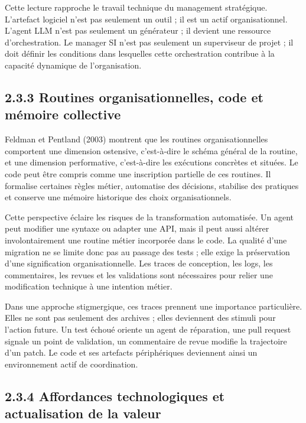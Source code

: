 Cette lecture rapproche le travail technique du management stratégique. L'artefact logiciel n'est pas seulement un outil ; il est un actif organisationnel. L'agent LLM n'est pas seulement un générateur ; il devient une ressource d'orchestration. Le manager SI n'est pas seulement un superviseur de projet ; il doit définir les conditions dans lesquelles cette orchestration contribue à la capacité dynamique de l'organisation.

\subsection{2.3.3 Routines organisationnelles, code et mémoire collective}\label{routines-organisationnelles-code-et-muxe9moire-collective}

Feldman et Pentland (2003) montrent que les routines organisationnelles comportent une dimension ostensive, c'est-à-dire le schéma général de la routine, et une dimension performative, c'est-à-dire les exécutions concrètes et situées. Le code peut être compris comme une inscription partielle de ces routines. Il formalise certaines règles métier, automatise des décisions, stabilise des pratiques et conserve une mémoire historique des choix organisationnels.

Cette perspective éclaire les risques de la transformation automatisée. Un agent peut modifier une syntaxe ou adapter une API, mais il peut aussi altérer involontairement une routine métier incorporée dans le code. La qualité d'une migration ne se limite donc pas au passage des tests ; elle exige la préservation d'une signification organisationnelle. Les traces de conception, les logs, les commentaires, les revues et les validations sont nécessaires pour relier une modification technique à une intention métier.

Dans une approche stigmergique, ces traces prennent une importance particulière. Elles ne sont pas seulement des archives ; elles deviennent des stimuli pour l'action future. Un test échoué oriente un agent de réparation, une pull request signale un point de validation, un commentaire de revue modifie la trajectoire d'un patch. Le code et ses artefacts périphériques deviennent ainsi un environnement actif de coordination.

\subsection{2.3.4 Affordances technologiques et actualisation de la valeur}\label{affordances-technologiques-et-actualisation-de-la-valeur}

